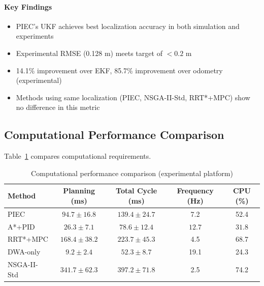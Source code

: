 
\paragraph{Key Findings}
\begin{itemize}
    \item PIEC's UKF achieves best localization accuracy in both simulation and experiments
    \item Experimental RMSE (0.128 m) meets target of $< 0.2$ m
    \item 14.1\% improvement over EKF, 85.7\% improvement over odometry (experimental)
    \item Methods using same localization (PIEC, NSGA-II-Std, RRT*+MPC) show no difference in this metric
\end{itemize}

\subsection{Computational Performance Comparison}

Table~\ref{tab:comparison_computation} compares computational requirements.

\begin{table}[htbp]
\centering
\caption{Computational performance comparison (experimental platform)}
\label{tab:comparison_computation}
\begin{tabular}{lcccc}
\toprule
\textbf{Method} & \textbf{Planning (ms)} & \textbf{Total Cycle (ms)} & \textbf{Frequency (Hz)} & \textbf{CPU (\%)} \\
\midrule
PIEC & $94.7 \pm 16.8$ & $139.4 \pm 24.7$ & 7.2 & 52.4 \\
A*+PID & $\mathbf{26.3 \pm 7.1}$ & $\mathbf{78.6 \pm 12.4}$ & $\mathbf{12.7}$ & $\mathbf{31.8}$ \\
RRT*+MPC & $168.4 \pm 38.2$ & $223.7 \pm 45.3$ & 4.5 & 68.7 \\
DWA-only & $9.2 \pm 2.4$ & $52.3 \pm 8.7$ & 19.1 & 24.3 \\
NSGA-II-Std & $341.7 \pm 62.3$ & $397.2 \pm 71.8$ & 2.5 & 74.2 \\
\bottomrule
\end{tabular}
\end{table}


